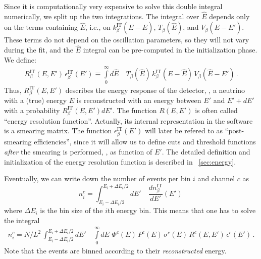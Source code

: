 Since it is computationally very expensive to solve this double integral
numerically, we split up the two integrations. The integral over $\hat{E}$
depends only on the terms containing $\hat{E}$, i.e., on $k_\beta^{\text{IT}}(E-\hat{E})$,
$ T_\beta(\hat{E})$, and $V_\beta(\hat{E}-E')$. These terms do not depend
on the oscillation parameters, so they will not vary during the fit,
and the $\hat{E}$ integral can be pre-computed in the initialization phase.
We define:
\begin{eqnarray}
\label{eq:e_res} 
R_\beta^{\text{IT}}(E,E')\,\epsilon_\beta^{\text{IT}}(E')
 \equiv
\int\limits_0^\infty d\hat{E} \quad T_\beta(\hat{E})\,k_\beta^{\text{IT}}(E-\hat{E})
\,V_\beta(\hat{E}-E')\,. 
\end{eqnarray}
Thus, $R_\beta^{\text{IT}}(E,E')$ describes the energy response of 
the detector, \ie , a neutrino with a (true) energy $E$ is reconstructed
with an energy between $E'$ and $E'+dE'$ with a probability
$R_\beta^{\text{IT}}(E,E') dE'$. The function $R(E,E')$ is often called ``energy resolution function''. Actually, its internal representation
in the software is a smearing matrix. The function $\epsilon_\beta^{\text{IT}}(E')$ will later be refered to as ``post-smearing efficiencies'', since it will allow us to define cuts and threshold functions {\em after} the smearing is performed, \ie, as function of $E'$. The detailed definition and initialization of the energy resolution function is described in \Sec~\ref{sec:energy}.

Eventually, we can write down the number of events per bin $i$  and channel $c$ as
\begin{equation}
\label{eq:channel}
n_i^c=\int_{E_i-\Delta E_i/2}^{E_i+\Delta E_i/2} dE' \quad
\frac{dn_{\beta}^{\text{IT}}}{dE'} (E') \,
\end{equation}
where $\Delta E_i$ is the bin size of the $i$th energy bin.
This means that one has to solve the integral
\begin{eqnarray}
\label{eq:events_bin}
n_i^c=N/L^2\,\int_{E_i-\Delta E_i/2}^{E_i+\Delta E_i/2} dE' 
\quad \int\limits_0^\infty dE \,\, \Phi^c(E)\,
P^c(E)\,
\sigma^c(E)\,
R^c(E,E')\,
\epsilon^c(E')\,.
\end{eqnarray} 
Note that the events are binned according to their \emph{reconstructed} energy.

